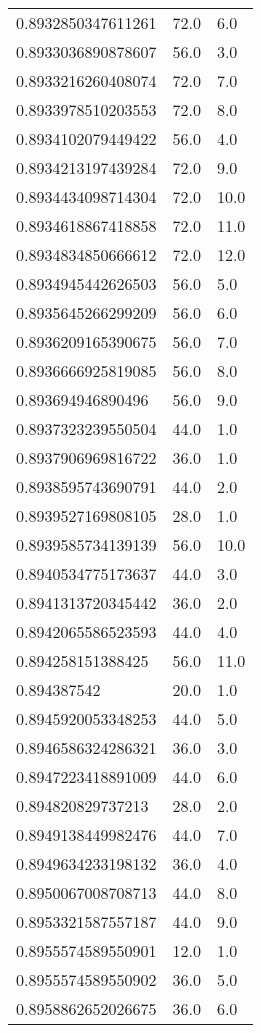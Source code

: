 \begin{center}
\begin{supertabular}[H]{p{0.30\textwidth}p{0.05\textwidth}p{0.05\textwidth}}
0.8932850347611261 & 72.0 & 6.0 \\ 
0.8933036890878607 & 56.0 & 3.0 \\ 
0.8933216260408074 & 72.0 & 7.0 \\ 
0.8933978510203553 & 72.0 & 8.0 \\ 
0.8934102079449422 & 56.0 & 4.0 \\ 
0.8934213197439284 & 72.0 & 9.0 \\ 
0.8934434098714304 & 72.0 & 10.0 \\ 
0.8934618867418858 & 72.0 & 11.0 \\ 
0.8934834850666612 & 72.0 & 12.0 \\ 
0.8934945442626503 & 56.0 & 5.0 \\ 
0.8935645266299209 & 56.0 & 6.0 \\ 
0.8936209165390675 & 56.0 & 7.0 \\ 
0.8936666925819085 & 56.0 & 8.0 \\ 
0.893694946890496 & 56.0 & 9.0 \\ 
0.8937323239550504 & 44.0 & 1.0 \\ 
0.8937906969816722 & 36.0 & 1.0 \\ 
0.8938595743690791 & 44.0 & 2.0 \\ 
0.8939527169808105 & 28.0 & 1.0 \\ 
0.8939585734139139 & 56.0 & 10.0 \\ 
0.8940534775173637 & 44.0 & 3.0 \\ 
0.8941313720345442 & 36.0 & 2.0 \\ 
0.8942065586523593 & 44.0 & 4.0 \\ 
0.894258151388425 & 56.0 & 11.0 \\ 
0.894387542 & 20.0 & 1.0 \\ 
0.8945920053348253 & 44.0 & 5.0 \\ 
0.8946586324286321 & 36.0 & 3.0 \\ 
0.8947223418891009 & 44.0 & 6.0 \\ 
0.894820829737213 & 28.0 & 2.0 \\ 
0.8949138449982476 & 44.0 & 7.0 \\ 
0.8949634233198132 & 36.0 & 4.0 \\ 
0.8950067008708713 & 44.0 & 8.0 \\ 
0.8953321587557187 & 44.0 & 9.0 \\ 
0.8955574589550901 & 12.0 & 1.0 \\ 
0.8955574589550902 & 36.0 & 5.0 \\ 
0.8958862652026675 & 36.0 & 6.0 \\ 

\end{supertabular}
\end{center}
